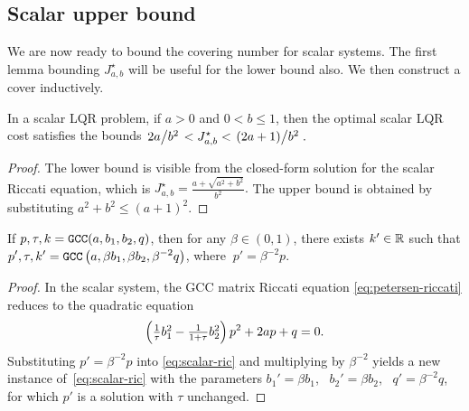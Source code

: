 \subsection{Scalar upper bound}

We are now ready to bound the covering number for scalar systems.
The first lemma bounding $J^\star_{a,b}$ will be useful for the lower bound also.
We then construct a cover inductively.

\begin{lemma}
\label{lem:scalar-cost-ub}
	In a scalar LQR problem,
	if $a > 0$ and $0 < b \leq 1$,
	then the optimal scalar LQR cost satisfies the bounds
	\(
		\left. 2a \middle/ b^2 \right.
		<
		J^\star_{a,b}
		<
		\left. (2a + 1) \middle/ b^2 \right..
	\)
\end{lemma}
\begin{proof}
	The lower bound is visible from
	the closed-form solution for the scalar Riccati equation, which is
	\(
		J^\star_{a,b} = \frac{a + \sqrt{a^2 + b^2}}{b^2}.
	\)
	The upper bound is obtained by substituting $a^2 + b^2 \leq (a + 1)^2$.
\end{proof}

\begin{lemma}
\label{lem:scalar-cover-recursion}
	If $p, \tau, k = {\normalfont \texttt{GCC}}(a, b_1, b_2, q)$,
	then for any $\beta \in (0, 1)$,
	there exists $k' \in \mathbb{R}$
	such that
	$\displaystyle p', \tau, k' = {\normalfont \texttt{GCC}} \left( a, \beta b_1, \beta b_2, \beta^{-2} q \right)$,
	where $\ p' = \beta^{-2} p$.%
\end{lemma}
\begin{proof}
	In the scalar system,
	the GCC matrix Riccati equation \eqref{eq:petersen-riccati}
	reduces to the quadratic equation
	\begin{equation}
	\label{eq:scalar-ric}
		\left(
			\textstyle \frac{1}{\tau} b_1^2
			- \frac{1}{1 + \tau} b_2^2
		\right)
		p^2
		+ 2a p
		+ q
		= 0.
	\end{equation}
	Substituting $p' = \beta^{-2} p$ into \eqref{eq:scalar-ric}
	and multiplying by $\beta^{-2}$ yields
	a new instance of~\eqref{eq:scalar-ric}
	with the parameters
		$b_1' = \beta b_1$, \ 
		$b_2' = \beta b_2$, \ 
		$q' = \beta^{-2} q$,
	for which $p'$ is a solution
	with $\tau$ unchanged.
\end{proof}


